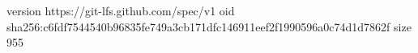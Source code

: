 version https://git-lfs.github.com/spec/v1
oid sha256:c6fdf7544540b96835fe749a3cb171dfc146911eef2f1990596a0c74d1d7862f
size 955
